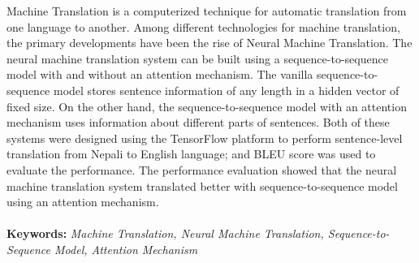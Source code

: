 Machine Translation is a computerized technique for automatic translation from one language to another. Among different technologies for machine translation, the primary developments have been the rise of Neural Machine Translation. The neural machine translation system can be built using a sequence-to-sequence model with and without an attention mechanism. The vanilla sequence-to-sequence model stores sentence information of any length in a hidden vector of fixed size. On the other hand, the sequence-to-sequence model with an attention mechanism uses information about different parts of sentences. Both of these systems were designed using the TensorFlow platform to perform sentence-level translation from Nepali to English language; and BLEU score was used to evaluate the performance. The performance evaluation showed that the neural machine translation system translated better with sequence-to-sequence model using an attention mechanism.
\\\\
\textbf{Keywords:} \textit{Machine Translation, Neural Machine Translation, Sequence-to-Sequence Model, Attention Mechanism}